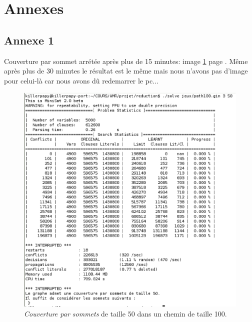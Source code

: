  \section{Annexes}
  \subsection{Annexe 1}
  Couverture par sommet arrétée après plus de 15 minutes: image
  \ref{lourd} page \pageref{lourd}. Même après plus de 30 minutes le
  résultat est le même mais nous n'avons pas d'image pour celui-là car
  nous avons dû redemarrer le pc...

  \begin{figure}[!ht]
   \begin{center}
    \includegraphics[width=12cm]{images/couv100.eps}
    \caption{\emph{Couverture par sommets} de taille 50 dans un chemin
    de taille 100.\label{lourd}}
   \end{center}
  \end{figure}

  \newpage

